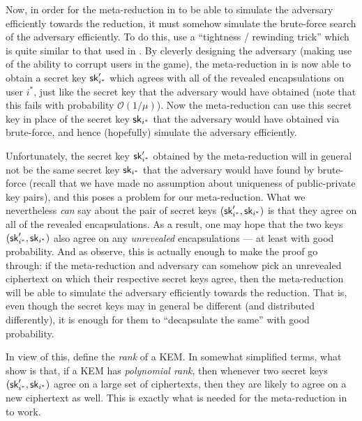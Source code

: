 Now, in order for the meta-reduction in \cite{AC:HanLiuGu21}
to be able to simulate the adversary efficiently towards the reduction,
it must somehow simulate the brute-force search of the adversary efficiently.
To do this, \cite{AC:HanLiuGu21}
use a ``tightness / rewinding trick'' which is quite similar to that used in \cite{EC:BJLS16}.
By cleverly designing the adversary
(making use of the ability to corrupt users in the \ECPA game),
the meta-reduction in \cite{AC:HanLiuGu21}
is now able to obtain a secret key \(\mathsf{sk}_{i^{*}}'\)
which agrees with all of the revealed encapsulations on user \(i^{*}\),
just like the secret key that the adversary
would have obtained
(note that this fails with probability \(\mathcal{O}(1/\mu)\)).
Now the meta-reduction can use this secret key
in place of the secret key \(\mathsf{sk}_{i^{*}}\)
that the adversary would have obtained via brute-force,
and hence (hopefully) simulate the adversary efficiently.

Unfortunately, the secret key \(\mathsf{sk}_{i^{*}}'\) obtained
by the meta-reduction will in general not be the same
secret key \(\mathsf{sk}_{i^{*}}\) that the adversary would have found by brute-force
(recall that we have made no assumption about uniqueness of public-private key pairs),
and this poses a problem for our meta-reduction.
What we nevertheless \emph{can} say about the pair of secret keys
\((\mathsf{sk}_{i^{*}}',\mathsf{sk}_{i^{*}})\)
is that they agree on all of the revealed encapsulations.
As a result, one may hope that the two keys
\((\mathsf{sk}_{i^{*}}',\mathsf{sk}_{i^{*}})\)
also agree on any \emph{unrevealed} encapsulations
--- at least with good probability.
And as \cite{AC:HanLiuGu21} observe,
this is actually enough to make the proof go through:
if the meta-reduction and adversary can somehow pick an unrevealed ciphertext
on which their respective secret keys agree,
then the meta-reduction will be able to simulate the adversary
efficiently towards the reduction.
That is, even though the secret keys may in general be different
(and distributed differently),
it is enough for them to ``decapsulate the same''
with good probability.


In view of this, \cite{AC:HanLiuGu21} define the \emph{rank} of a KEM.
In somewhat simplified terms,
what \cite{AC:HanLiuGu21} show
is that, if a KEM has \emph{polynomial rank},
then whenever two secret keys \((\mathsf{sk}_{i^{*}}',\mathsf{sk}_{i^{*}})\)
agree on a large set of ciphertexts,
then they are likely to agree on a new ciphertext as well.
This is exactly what is needed for the meta-reduction
in \cite{AC:HanLiuGu21} to work.

